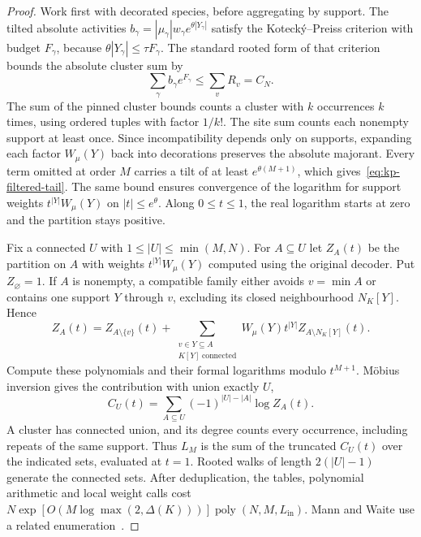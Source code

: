 \documentclass[10pt,twocolumn]{article}
\theoremstyle{definition}
\DeclareMathOperator{\poly}{poly}
\newcommand{\Lin}{L_{\mathrm{in}}}
\begin{document}
\begin{proof}
Work first with decorated species, before aggregating by support. The
tilted absolute activities
$b_\gamma=|\mu_\gamma|w_\gamma e^{\theta|Y_\gamma|}$ satisfy the
Koteck\'y--Preiss criterion with budget $F_\gamma$, because
$\theta|Y_\gamma|\le\tau F_\gamma$.
The standard rooted form of that criterion~\cite[Thm.~1]{Uel04} bounds the
absolute cluster sum by
\[
 \sum_\gamma b_\gamma e^{F_\gamma}
       \le\sum_v R_v=C_N.
\]
The sum of the pinned cluster bounds counts a cluster with $k$
occurrences $k$ times, using ordered tuples with factor $1/k!$.
The site sum counts each nonempty support at least once. Since
incompatibility depends only on supports, expanding each factor
$W_\mu(Y)$ back into decorations preserves the absolute majorant.
Every term omitted at order $M$ carries a tilt of at least
$e^{\theta(M+1)}$, which gives~\eqref{eq:kp-filtered-tail}.
The same bound ensures convergence of the logarithm for support
weights $t^{|Y|}W_\mu(Y)$ on $|t|\le e^\theta$. Along $0\le t\le1$,
the real logarithm starts at zero and the partition stays positive.

Fix a connected $U$ with $1\le|U|\le\min(M,N)$. For $A\subseteq U$
let $Z_A(t)$ be the partition on $A$ with weights $t^{|Y|}W_\mu(Y)$
computed using the original decoder. Put $Z_\varnothing=1$.
If $A$ is nonempty, a compatible family either avoids $v=\min A$
or contains one support $Y$ through $v$, excluding its closed
neighbourhood $N_K[Y]$. Hence
\[
 Z_A(t)=Z_{A\setminus\{v\}}(t)
  +\sum_{\substack{v\in Y\subseteq A\\K[Y]\ \mathrm{connected}}}
    W_\mu(Y)t^{|Y|} Z_{A\setminus N_K[Y]}(t).
\]
Compute these polynomials and their formal logarithms modulo
$t^{M+1}$. M\"obius inversion gives the contribution with union
exactly $U$,
\[
 C_U(t)=\sum_{A\subseteq U}(-1)^{|U|-|A|}\log Z_A(t).
\]
A cluster has connected union, and its degree counts every occurrence,
including repeats of the same support. Thus $L_M$ is the sum of the
truncated $C_U(t)$ over the indicated sets, evaluated at $t=1$.
Rooted walks of length $2(|U|-1)$ generate the connected sets.
After deduplication, the tables, polynomial arithmetic and local
weight calls cost $N\exp[O(M\log\max(2,\Delta(K)))]\poly(N,M,\Lin)$.
Mann and Waite use a related enumeration~\cite[Lemma~4]{MW25}.


\end{proof}
\end{document}
